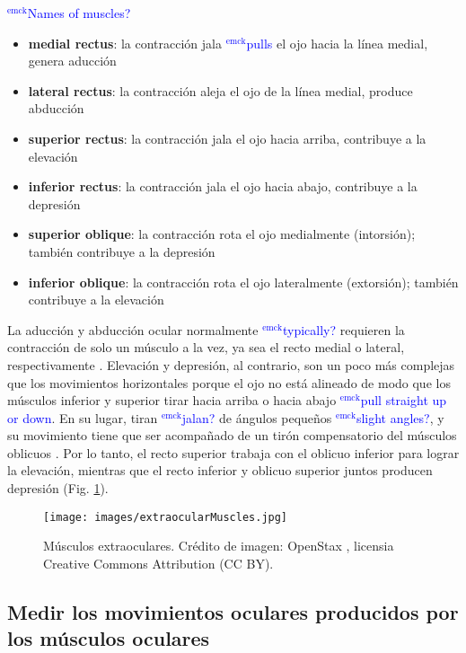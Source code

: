 \documentclass[12pt]{article}
\newcommand{\emck}[1]{\textcolor{blue}{$^{\textrm{emck}}${#1}}}
\begin{document}
\vspace{0.3cm}

\emck{Names of muscles?}

\begin{itemize}
\item \textbf{medial rectus}: la contracción jala \emck{pulls} el ojo
  hacia la línea medial, genera aducción
\item \textbf{lateral rectus}: la contracción aleja el ojo de la
línea medial, produce abducción
\item \textbf{superior rectus}: la contracción jala el ojo hacia
  arriba, contribuye a la elevación
\item \textbf{inferior rectus}: la contracción jala el ojo hacia
  abajo, contribuye a la depresión
\item \textbf{superior oblique}: la contracción rota el ojo
  medialmente (intorsión); también contribuye a la depresión
\item \textbf{inferior oblique}: la contracción rota el ojo lateralmente
(extorsión); también contribuye a la elevación
\end{itemize}

\vspace{0.3cm}

La aducción y abducción ocular normalmente \emck{typically?} requieren
la contracción de solo un músculo a la vez, ya sea el recto medial o
lateral, respectivamente \cite{purves2001editors}. Elevación y
depresión, al contrario, son un poco más complejas que los movimientos
horizontales porque el ojo no está alineado de modo que los músculos
inferior y superior tirar hacia arriba o hacia abajo \emck{pull
  straight up or down}. En su lugar, tiran \emck{jalan?} de ángulos
pequeños \emck{slight angles?}, y su movimiento tiene que ser
acompañado de un tirón compensatorio del músculos oblicuos
\cite{openStax2017sensory}. Por lo tanto, el recto superior trabaja
con el oblicuo inferior para lograr la elevación, mientras que el
recto inferior y oblicuo superior juntos producen depresión
\cite{purves2001editors} (Fig. \ref{fig:eyeMuscles}).

\begin{figure}[h!]
\centering
\texttt{[image: images/extraocularMuscles.jpg]}
\caption{Músculos extraoculares. Crédito de imagen: OpenStax
  \cite{openStax2017sensory}, licensia Creative Commons Attribution
  (CC BY).}
\label{fig:eyeMuscles}
\end{figure}

\subsection*{Medir los movimientos oculares producidos por los músculos oculares}
\end{document}

